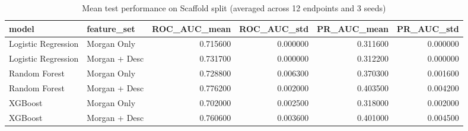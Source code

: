 \begin{table}
\caption{Mean test performance on Scaffold split (averaged across 12 endpoints and 3 seeds)}
\label{tab:results_scaffold}
\begin{tabular}{llrrrr}
\toprule
model & feature_set & ROC_AUC_mean & ROC_AUC_std & PR_AUC_mean & PR_AUC_std \\
\midrule
Logistic Regression & Morgan Only & 0.715600 & 0.000000 & 0.311600 & 0.000000 \\
Logistic Regression & Morgan + Desc & 0.731700 & 0.000000 & 0.312200 & 0.000000 \\
Random Forest & Morgan Only & 0.728800 & 0.006300 & 0.370300 & 0.001600 \\
Random Forest & Morgan + Desc & 0.776200 & 0.002000 & 0.403500 & 0.004200 \\
XGBoost & Morgan Only & 0.702000 & 0.002500 & 0.318000 & 0.002000 \\
XGBoost & Morgan + Desc & 0.760600 & 0.003600 & 0.401000 & 0.004500 \\
\bottomrule
\end{tabular}
\end{table}
